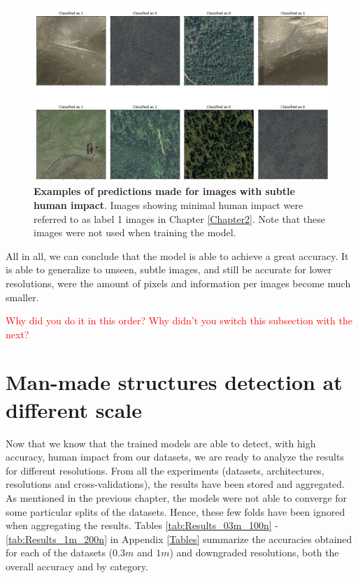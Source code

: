 \begin{figure}[H]
	\centering
	\captionsetup{width=1\linewidth}
	\includegraphics[width=1\textwidth]{Figures/results/class_dataset03m_res03_l1.png}
	\caption{\textbf{Examples of predictions made for images with subtle human impact}. Images showing minimal human impact were referred to as label 1 images in Chapter \ref{Chapter2}. Note that these images were not used when training the model.}
	\label{fig:dataset03m_res03_l1}
\end{figure}

All in all, we can conclude that the model is able to achieve a great accuracy. It is able to generalize to unseen, subtle images, and still be accurate for lower resolutions, were the amount of pixels and information per images become much smaller. 

\textcolor{red}{Why did you do it in this order? Why didn't you switch this subsection with the next?}

\section{Man-made structures detection at different scale}

Now that we know that the trained models are able to detect, with high accuracy, human impact from our datasets, we are ready to analyze the results for different resolutions. From all the experiments (datasets, architectures, resolutions and cross-validations), the results have been stored and aggregated. As mentioned in the previous chapter, the models were not able to converge for some particular splits of the datasets. Hence, these few folds have been ignored when aggregating the results. Tables \ref{tab:Results_03m_100n} - \ref{tab:Results_1m_200n} in Appendix \ref{Tables} summarize the accuracies obtained for each of the datasets ($0.3m$ and $1m$) and downgraded resolutions, both the overall accuracy and by category. 

